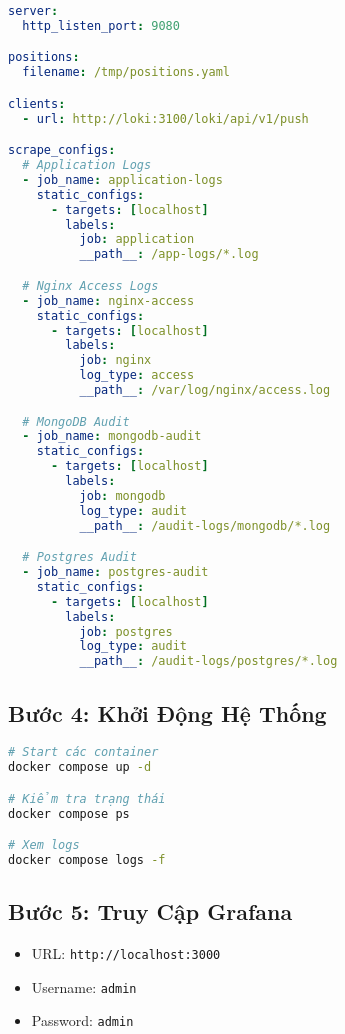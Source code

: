 \documentclass[a4paper,12pt]{article}
\begin{document}
\begin{lstlisting}[language=yaml]
server:
  http_listen_port: 9080

positions:
  filename: /tmp/positions.yaml

clients:
  - url: http://loki:3100/loki/api/v1/push

scrape_configs:
  # Application Logs
  - job_name: application-logs
    static_configs:
      - targets: [localhost]
        labels:
          job: application
          __path__: /app-logs/*.log

  # Nginx Access Logs
  - job_name: nginx-access
    static_configs:
      - targets: [localhost]
        labels:
          job: nginx
          log_type: access
          __path__: /var/log/nginx/access.log

  # MongoDB Audit
  - job_name: mongodb-audit
    static_configs:
      - targets: [localhost]
        labels:
          job: mongodb
          log_type: audit
          __path__: /audit-logs/mongodb/*.log

  # Postgres Audit
  - job_name: postgres-audit
    static_configs:
      - targets: [localhost]
        labels:
          job: postgres
          log_type: audit
          __path__: /audit-logs/postgres/*.log
\end{lstlisting}

\subsection{Bước 4: Khởi Động Hệ Thống}

\begin{lstlisting}[language=bash]
# Start các container
docker compose up -d

# Kiểm tra trạng thái
docker compose ps

# Xem logs
docker compose logs -f
\end{lstlisting}

\subsection{Bước 5: Truy Cập Grafana}

\begin{itemize}
    \item URL: \texttt{http://localhost:3000}
    \item Username: \texttt{admin}
    \item Password: \texttt{admin}
\end{itemize}
\end{document}
